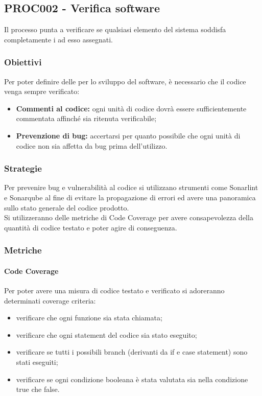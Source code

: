 \documentclass[PianoDiQualifica.tex]{subfiles}
\begin{document}
\subsection{PROC002 - Verifica software}
Il processo punta a verificare se qualsiasi elemento del sistema soddisfa completamente i  ad esso assegnati.
\subsubsection{Obiettivi}
Per poter definire delle  per lo sviluppo del software, è necessario che il codice venga sempre verificato:
 \begin{itemize}
 	\item \textbf{Commenti al codice:} ogni unità di codice dovrà essere sufficientemente commentata affinché sia ritenuta verificabile;
 	\item \textbf{Prevenzione di bug:} accertarsi per quanto possibile che ogni unità di codice non sia affetta da bug prima dell'utilizzo.
 \end{itemize}
\subsubsection{Strategie}
Per prevenire bug e vulnerabilità al codice si utilizzano strumenti come Sonarlint e Sonarqube al fine di evitare la propagazione di errori ed avere una panoramica sullo stato generale del codice prodotto.\\
Si utilizzeranno delle metriche di Code Coverage per avere consapevolezza della quantità di codice testato e poter agire di conseguenza.
 
\subsubsection{Metriche}
\paragraph{Code Coverage}
Per poter avere una misura di codice testato e verificato si adoreranno determinati coverage criteria:
\begin{itemize}%
	\item {} verificare che ogni funzione sia stata chiamata;
	\item {} verificare che ogni statement del codice sia stato eseguito; 
	\item {} verificare se tutti i possibili branch (derivanti da if e case statement) sono stati eseguiti;
	\item {} verificare se ogni condizione booleana è stata valutata sia nella condizione true che false. 
\end{itemize}
\end{document}
